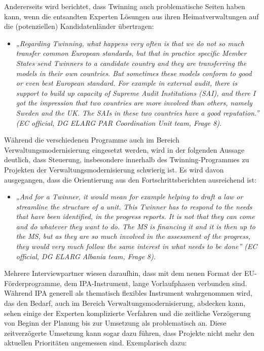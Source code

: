 Andererseits wird berichtet, dass Twinning auch problematische Seiten haben kann, wenn die entsandten Experten Lösungen aus ihren Heimatverwaltungen auf die (potenziellen) Kandidatenländer übertragen:
\begin{itemize}[label={}]
\item \textit{„Regarding Twinning, what happens very often is that we do not so much transfer common European standards, but that in practice specific Member States send Twinners to a candidate country and they are transferring the models in their own countries. But sometimes these models conform to good or even best European standard. For example in external audit, there is support to build up capacity of Supreme Audit Institutions (SAI), and there I got the impression that two countries are more involved than others, namely Sweden and the UK. The SAIs in these two countries have a good reputation.” (EC official, DG ELARG PAR Coordination Unit team, Frage 8).}
\end{itemize}
Während die verschiedenen Programme auch im Bereich Verwaltungsmodernisierung eingesetzt werden, wird in der folgenden Aussage deutlich, dass Steuerung, insbesondere innerhalb des Twinning-Programmes zu Projekten der Verwaltungsmodernisierung schwierig ist. Es wird davon ausgegangen, dass die Orientierung aus den Fortschrittsberichten ausreichend ist:
\begin{itemize}[label={}]
\item \textit{„And for a Twinner, it would mean for example helping to draft a law or streamline the structure of a unit. This Twinner has to respond to the needs that have been identified, in the progress reports. It is not that they can come and do whatever they want to do. The MS is financing it and it is then up to the MS, but as they are so much involved in the assessment of the progress, they would very much follow the same interest in what needs to be done” (EC official, DG ELARG Albania team, Frage 8).}
\end{itemize}
Mehrere Interviewpartner wiesen daraufhin, dass mit dem neuen Format der EU-Förderprogramme, dem IPA-Instrument, lange Vorlaufphasen verbunden sind. Während IPA generell als thematisch flexibles Instrument wahrgenommen wird, das den Bedarf, auch im Bereich Verwaltungsmodernisierung, abdecken kann, sehen einige der Experten komplizierte Verfahren und die zeitliche Verzögerung von Beginn der Planung bis zur Umsetzung als problematisch an. Diese zeitverzögerte Umsetzung kann sogar dazu führen, dass Projekte nicht mehr den aktuellen Prioritäten angemessen sind. Exemplarisch dazu:
